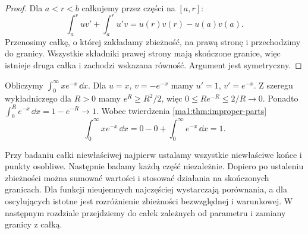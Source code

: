 \begin{proof}
Dla $a<r<b$ całkujemy przez części na $[a,r]$:
\[
 \int_a^r uv'+\int_a^r u'v=u(r)v(r)-u(a)v(a).
\]
Przenosimy całkę, o której zakładamy zbieżność, na prawą stronę i przechodzimy do granicy. Wszystkie składniki prawej strony mają skończone granice, więc istnieje druga całka i zachodzi wskazana równość. Argument jest symetryczny.
\end{proof}
\begin{przyklad}
\label{ma1:ex:improper-parts-exp}
Obliczymy $\int_0^\infty xe^{-x}\,\dd x$. Dla $u=x$, $v=-e^{-x}$ mamy $u'=1$, $v'=e^{-x}$. Z szeregu wykładniczego dla $R>0$ mamy $e^R\ge R^2/2$, więc $0\le Re^{-R}\le2/R\to0$. Ponadto $\int_0^R e^{-x}\,\dd x=1-e^{-R}\to1$. Wobec twierdzenia \ref{ma1:thm:improper-parts}
\[
 \int_0^\infty xe^{-x}\,\dd x=0-0+\int_0^\infty e^{-x}\,\dd x=1.
\]
\end{przyklad}
Przy badaniu całki niewłaściwej najpierw ustalamy wszystkie niewłaściwe końce i punkty osobliwe. Następnie badamy każdą część niezależnie. Dopiero po ustaleniu zbieżności można sumować wartości i stosować działania na skończonych granicach. Dla funkcji nieujemnych najczęściej wystarczają porównania, a dla oscylujących istotne jest rozróżnienie zbieżności bezwzględnej i warunkowej. W następnym rozdziale przejdziemy do całek zależnych od parametru i zamiany granicy z całką.
